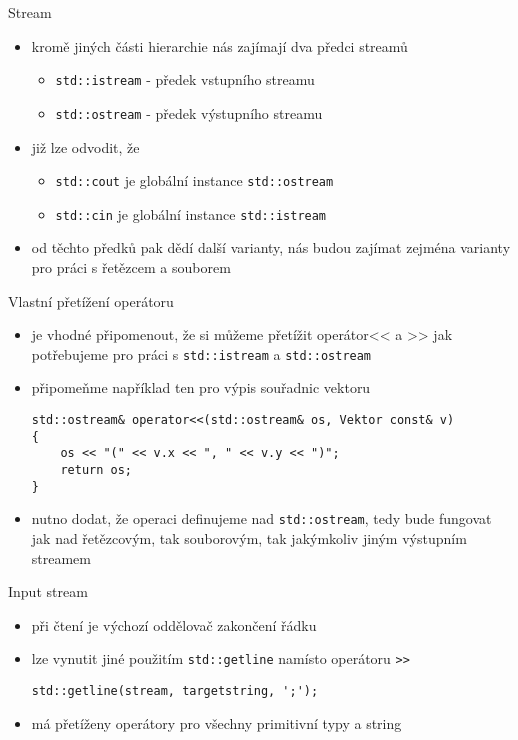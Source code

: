 \documentclass{beamer}
\begin{document}
\begin{xframe}{Stream}
	\begin{itemize}
		\item kromě jiných části hierarchie nás zajímají dva předci streamů
			\begin{itemize}
				\item \texttt{std::istream} - předek vstupního streamu
				\item \texttt{std::ostream} - předek výstupního streamu
			\end{itemize}
		\item již lze odvodit, že
			\begin{itemize}
				\item \texttt{std::cout} je globální instance \texttt{std::ostream}
				\item \texttt{std::cin} je globální instance \texttt{std::istream}
			\end{itemize}
		\item od těchto předků pak dědí další varianty, nás budou zajímat zejména varianty pro práci s řetězcem a souborem
	\end{itemize}
\end{xframe}

\begin{xframe}{Vlastní přetížení operátoru}
	\begin{itemize}
		\item je vhodné připomenout, že si můžeme přetížit operátor<< a >> jak potřebujeme pro práci s \texttt{std::istream} a \texttt{std::ostream}
		\item připomeňme například ten pro výpis souřadnic vektoru
\begin{lstlisting}[basicstyle=\fontsize{8}{9}\selectfont\ttfamily]
std::ostream& operator<<(std::ostream& os, Vektor const& v)
{
    os << "(" << v.x << ", " << v.y << ")";
    return os;
}
\end{lstlisting}
		\item nutno dodat, že operaci definujeme nad \texttt{std::ostream}, tedy bude fungovat jak nad řetězcovým, tak souborovým, tak jakýmkoliv jiným výstupním streamem
	\end{itemize}
\end{xframe}


\begin{xframe}{Input stream}
	\begin{itemize}
		\item při čtení je výchozí oddělovač zakončení řádku
		\item lze vynutit jiné použitím \texttt{std::getline} namísto operátoru \texttt{>>}
\begin{lstlisting}[basicstyle=\fontsize{8}{9}\selectfont\ttfamily]
std::getline(stream, targetstring, ';');
\end{lstlisting}
		\item má přetíženy operátory pro všechny primitivní typy a string
	\end{itemize}
\end{xframe}
\end{document}
